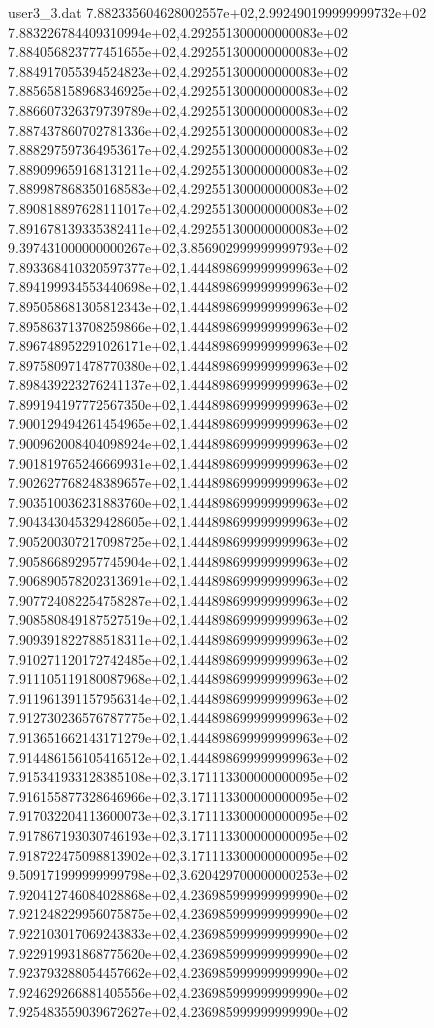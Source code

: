 \begin{filecontents}{user3_3.dat}
7.882335604628002557e+02,2.992490199999999732e+02
7.883226784409310994e+02,4.292551300000000083e+02
7.884056823777451655e+02,4.292551300000000083e+02
7.884917055394524823e+02,4.292551300000000083e+02
7.885658158968346925e+02,4.292551300000000083e+02
7.886607326379739789e+02,4.292551300000000083e+02
7.887437860702781336e+02,4.292551300000000083e+02
7.888297597364953617e+02,4.292551300000000083e+02
7.889099659168131211e+02,4.292551300000000083e+02
7.889987868350168583e+02,4.292551300000000083e+02
7.890818897628111017e+02,4.292551300000000083e+02
7.891678139335382411e+02,4.292551300000000083e+02
9.397431000000000267e+02,3.856902999999999793e+02
7.893368410320597377e+02,1.444898699999999963e+02
7.894199934553440698e+02,1.444898699999999963e+02
7.895058681305812343e+02,1.444898699999999963e+02
7.895863713708259866e+02,1.444898699999999963e+02
7.896748952291026171e+02,1.444898699999999963e+02
7.897580971478770380e+02,1.444898699999999963e+02
7.898439223276241137e+02,1.444898699999999963e+02
7.899194197772567350e+02,1.444898699999999963e+02
7.900129494261454965e+02,1.444898699999999963e+02
7.900962008404098924e+02,1.444898699999999963e+02
7.901819765246669931e+02,1.444898699999999963e+02
7.902627768248389657e+02,1.444898699999999963e+02
7.903510036231883760e+02,1.444898699999999963e+02
7.904343045329428605e+02,1.444898699999999963e+02
7.905200307217098725e+02,1.444898699999999963e+02
7.905866892957745904e+02,1.444898699999999963e+02
7.906890578202313691e+02,1.444898699999999963e+02
7.907724082254758287e+02,1.444898699999999963e+02
7.908580849187527519e+02,1.444898699999999963e+02
7.909391822788518311e+02,1.444898699999999963e+02
7.910271120172742485e+02,1.444898699999999963e+02
7.911105119180087968e+02,1.444898699999999963e+02
7.911961391157956314e+02,1.444898699999999963e+02
7.912730236576787775e+02,1.444898699999999963e+02
7.913651662143171279e+02,1.444898699999999963e+02
7.914486156105416512e+02,1.444898699999999963e+02
7.915341933128385108e+02,3.171113300000000095e+02
7.916155877328646966e+02,3.171113300000000095e+02
7.917032204113600073e+02,3.171113300000000095e+02
7.917867193030746193e+02,3.171113300000000095e+02
7.918722475098813902e+02,3.171113300000000095e+02
9.509171999999999798e+02,3.620429700000000253e+02
7.920412746084028868e+02,4.236985999999999990e+02
7.921248229956075875e+02,4.236985999999999990e+02
7.922103017069243833e+02,4.236985999999999990e+02
7.922919931868775620e+02,4.236985999999999990e+02
7.923793288054457662e+02,4.236985999999999990e+02
7.924629266881405556e+02,4.236985999999999990e+02
7.925483559039672627e+02,4.236985999999999990e+02

\end{filecontents}
